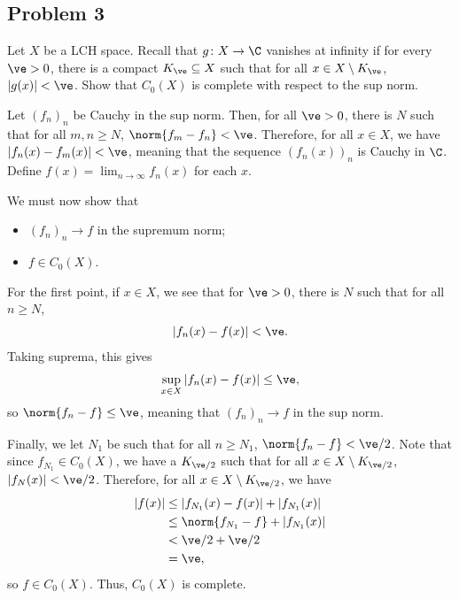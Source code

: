\documentclass[10pt]{mypackage}
\begin{document}
\subsection{Problem 3}%
\begin{problem}
  Let $X$ be a LCH space. Recall that $g\colon X\rightarrow \C$ vanishes at infinity if for every $\ve > 0$, there is a compact $K_{\ve}\subseteq X$ such that for all $x\in X\setminus K_{\ve}$, $\left\vert g(x) \right\vert < \ve$. Show that $C_0\left( X \right)$ is complete with respect to the sup norm.
\end{problem}
Let $\left( f_n \right)_n$ be Cauchy in the sup norm. Then, for all $\ve > 0$, there is $N$ such that for all $m,n\geq N$, $\norm{f_m - f_n} < \ve$. Therefore, for all $x\in X$, we have $\left\vert f_n(x)-f_m(x) \right\vert < \ve$, meaning that the sequence $\left( f_n(x) \right)_n$ is Cauchy in $\C$. Define $f(x) = \lim_{n\rightarrow\infty}f_n(x)$ for each $x$.\newline

We must now show that
\begin{itemize}
  \item $\left( f_n \right)_n\rightarrow f$ in the supremum norm;
  \item $f\in C_0\left( X \right)$.
\end{itemize}
For the first point, if $x\in X$, we see that for $\ve > 0$, there is $N$ such that for all $n \geq N$,
\begin{align*}
  \left\vert f_n(x)-f(x) \right\vert < \ve.
\end{align*}
Taking suprema, this gives
\begin{align*}
  \sup_{x\in X} \left\vert f_n(x)-f(x) \right\vert \leq \ve,
\end{align*}
so $\norm{f_n - f} \leq \ve$, meaning that $\left( f_n \right)_n\rightarrow f$ in the sup norm.\newline

Finally, we let $N_1$ be such that for all $n\geq N_1$, $\norm{f_n - f} < \ve/2$. Note that since $f_{N_1}\in C_0\left( X \right)$, we have a $K_{\ve/2}$ such that for all $x\in X\setminus K_{\ve/2}$, $\left\vert f_N(x) \right\vert < \ve/2$. Therefore, for all $x\in X\setminus K_{\ve/2}$, we have
\begin{align*}
  \left\vert f(x) \right\vert &\leq \left\vert f_{N_1}(x)-f(x) \right\vert + \left\vert f_{N_1}(x) \right\vert\\
                              &\leq \norm{f_{N_1} - f} + \left\vert f_{N_1}(x) \right\vert\\
                              &< \ve/2 + \ve/2\\
                              &= \ve,
\end{align*}
so $f\in C_0\left( X \right)$. Thus, $C_0\left( X \right)$ is complete.
\end{document}
